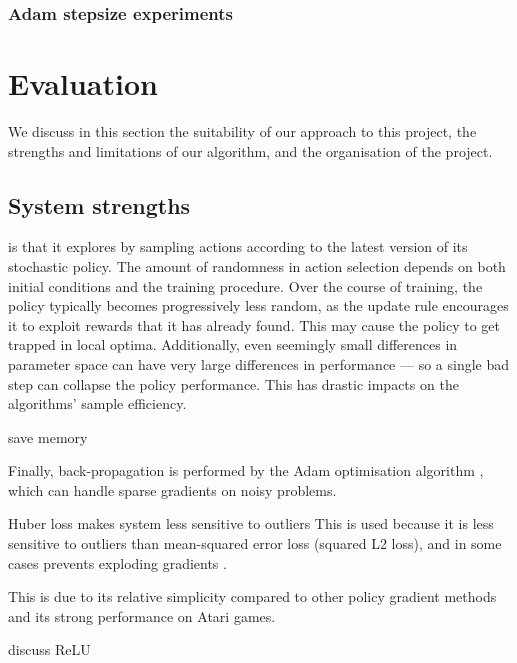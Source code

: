 \documentclass[12pt,a4paper]{article}
\begin{document}
\subsubsection{Adam stepsize experiments}

\newpage
\section{Evaluation}
We discuss in this section the suitability of our approach to this project, the strengths and limitations of our algorithm, and the organisation of the project.

\subsection{System strengths} 
is that it explores by sampling actions according to the latest version of its stochastic policy. The amount of randomness in action selection depends on both initial conditions and the training procedure. Over the course of training, the policy typically becomes progressively less random, as the update rule encourages it to exploit rewards that it has already found. This may cause the policy to get trapped in local optima. Additionally, even seemingly small differences in parameter space can have very large differences in performance --- so a single bad step can collapse the policy performance. This has drastic impacts on the algorithms' sample efficiency.

save memory

Finally, back-propagation is performed by the Adam optimisation algorithm \cite{kingma2017adam}, which can handle sparse gradients on noisy problems.

Huber loss makes system less sensitive to outliers
This is used because it is less sensitive to outliers than mean-squared error loss (squared L2 loss), and in some cases prevents exploding gradients \cite{girshick2015fast}.

This is due to its relative simplicity compared to other policy gradient methods and its strong performance on Atari games.

discuss ReLU


\end{document}
